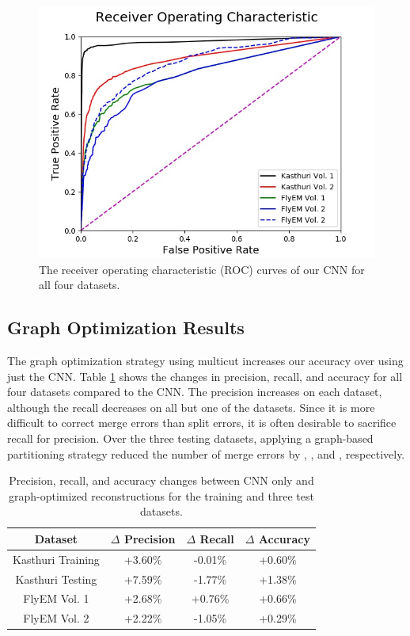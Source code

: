 \begin{figure}
	\centering
	\includegraphics[width=0.95\linewidth]{./figures/receiver-operating-characteristic.jpg}
	\caption{The receiver operating characteristic (ROC) curves of our CNN for all four datasets.}
	\label{fig:receiver-operating-characteristic}
\end{figure}

\subsection{Graph Optimization Results}

The graph optimization strategy using multicut increases our accuracy over using just the CNN.
Table \ref{table:multicut} shows the changes in precision, recall, and accuracy for all four datasets compared to the CNN.
The precision increases on each dataset, although the recall decreases on all but one of the datasets.
Since it is more difficult to correct merge errors than split errors, it is often desirable to sacrifice recall for precision.
Over the three testing datasets, applying a graph-based partitioning strategy reduced the number of merge errors by , , and , respectively. 

\begin{table}[h]
	\centering
	\begin{tabular}{c c c c} \hline
		\textbf{Dataset} & $\Delta$ \textbf{Precision} & $\Delta$ \textbf{Recall} & $\Delta$ \textbf{Accuracy} \\ \hline
		Kasthuri Training & +3.60\% & -0.01\% & +0.60\% \\
		Kasthuri Testing & +7.59\% & -1.77\% & +1.38\% \\
		FlyEM Vol. 1 & +2.68\% & +0.76\% & +0.66\% \\
		FlyEM Vol. 2 & +2.22\% & -1.05\% & +0.29\% \\ \hline
	\end{tabular}
	\caption{Precision, recall, and accuracy changes between CNN only and graph-optimized reconstructions for the training and three test datasets.}
	\label{table:multicut}
\end{table}

